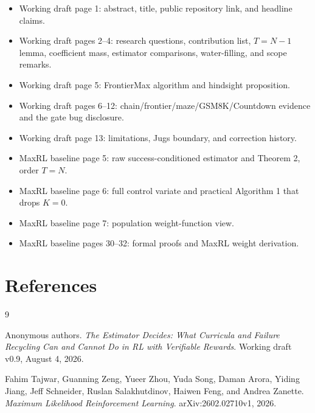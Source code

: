 \documentclass[11pt]{article}
\theoremstyle{definition}
\theoremstyle{remark}
\begin{document}
\begin{itemize}[leftmargin=2em]
\item Working draft page 1: abstract, title, public repository link, and headline claims.
\item Working draft pages 2--4: research questions, contribution list, $T=N-1$ lemma, coefficient mass, estimator comparisons, water-filling, and scope remarks.
\item Working draft page 5: FrontierMax algorithm and hindsight proposition.
\item Working draft pages 6--12: chain/frontier/maze/GSM8K/Countdown evidence and the gate bug disclosure.
\item Working draft page 13: limitations, Jugs boundary, and correction history.
\item MaxRL baseline page 5: raw success-conditioned estimator and Theorem 2, order $T=N$.
\item MaxRL baseline page 6: full control variate and practical Algorithm 1 that drops $K=0$.
\item MaxRL baseline page 7: population weight-function view.
\item MaxRL baseline pages 30--32: formal proofs and MaxRL weight derivation.
\end{itemize}

\section{References}

\begin{thebibliography}{9}

Anonymous authors.
\newblock \emph{The Estimator Decides: What Curricula and Failure Recycling Can and Cannot Do in RL with Verifiable Rewards}.
\newblock Working draft v0.9, August 4, 2026.

Fahim Tajwar, Guanning Zeng, Yueer Zhou, Yuda Song, Daman Arora, Yiding Jiang, Jeff Schneider, Ruslan Salakhutdinov, Haiwen Feng, and Andrea Zanette.
\newblock \emph{Maximum Likelihood Reinforcement Learning}.
\newblock arXiv:2602.02710v1, 2026.

\end{thebibliography}
\end{document}
